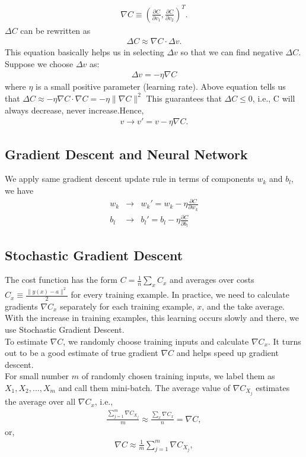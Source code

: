 \begin{eqnarray} 
\nabla C \equiv \left( \frac{\partial C}{\partial v_1}, 
\frac{\partial C}{\partial v_2} \right)^T.
\end{eqnarray}
$\Delta C$ can be rewritten as
\begin{eqnarray} 
\Delta C \approx \nabla C \cdot \Delta v.
\end{eqnarray}
This equation basically helps us in selecting $\Delta v$ so that we can find negative $\Delta C$.
Suppose we choose $\Delta v$ as:
\begin{eqnarray} 
\Delta v = -\eta \nabla C
\end{eqnarray}
where $\eta$ is a small positive parameter (learning rate).
Above equation tells us that 
$\Delta C \approx -\eta \nabla C \cdot \nabla C = -\eta \|\nabla C\|^2$
This guarantees that $\Delta C \leq 0$, i.e., C will always decrease, never increase.Hence, 
\begin{eqnarray}
v \rightarrow v' = v -\eta \nabla C.
\end{eqnarray}

\subsection{Gradient Descent and Neural Network}
We apply same gradient descent update rule in terms of components $w_{k}$ and $b_{l}$, we have
\begin{eqnarray}
w_k & \rightarrow & w_k' = w_k-\eta \frac{\partial C}{\partial w_k}\\
b_l & \rightarrow & b_l' = b_l-\eta \frac{\partial C}{\partial b_l}
\end{eqnarray}

\subsection{Stochastic Gradient Descent}
The cost function has the form $C = \frac{1}{n} \sum_x C_x$ and averages over costs $C_x \equiv \frac{\|y(x)-a\|^2}{2}$ for every training example. In practice, we need to calculate gradients $\nabla C_x$ separately for each training example, $x$, and the take average. With the increase in training examples, this learning occurs slowly and there, we use Stochastic Gradient Descent.\\
To estimate $\nabla C$, we randomly choose training inputs and calculate $\nabla C_x$. It turns out to be a good estimate of true gradient $\nabla C$ and helps speed up gradient descent.\\
For small number $m$ of randomly chosen training inputs, we label them as  $X_1, X_2,...,X_m$  and call them mini-batch. The average value of $\nabla C_{X_{j}}$ estimates the average over all $\nabla C_x$, i.e.,
\begin{eqnarray}
\frac{\sum_{j=1}^m \nabla C_{X_{j}}}{m} \approx \frac{\sum_x \nabla C_x}{n} = \nabla C,
\end{eqnarray}
or,
\begin{eqnarray}
\nabla C \approx \frac{1}{m} \sum_{j=1}^m \nabla C_{X_{j}},
\end{eqnarray}

